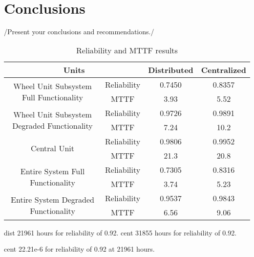 \newpage
\section{Conclusions}
\label{S6}
/{Present your conclusions and recommendations.}/\cite{sharpe}\cite{gnuplot}

\begin{table}[h]
\centering
	\begin{tabular}{| c | c | c | c |}
		\hline
		\multicolumn{2}{|c|}{Units} & Distributed & Centralized\\
		\hline
		\multirow{2}{*}{Wheel Unit Subsystem Full Functionality} & Reliability & 0.7450 & 0.8357\\
		 & MTTF & 3.93  & 5.52\\
		\hline
		\multirow{2}{*}{Wheel Unit Subsystem Degraded Functionality}& Reliability & 0.9726  & 0.9891\\
		 & MTTF & 7.24 & 10.2\\
		\hline
		\multirow{2}{*}{Central Unit}& Reliability& 0.9806  & 0.9952\\
		 & MTTF & 21.3  & 20.8\\
		\hline
		\multirow{2}{*}{Entire System Full Functionality}& Reliability & 0.7305  & 0.8316\\
		 & MTTF & 3.74 & 5.23\\
		\hline
		\multirow{2}{*}{Entire System Degraded Functionality}& Reliability & 0.9537 & 0.9843\\
		 & MTTF & 6.56 & 9.06\\
		\hline
	\end{tabular}
\caption{Reliability and MTTF results}
\label{tab:Put a Lable}
\end{table}



dist 21961 hours for reliability of 0.92.
cent 31855 hours for reliability of 0.92.

cent 22.21e-6 for reliability of 0.92 at 21961 hours.